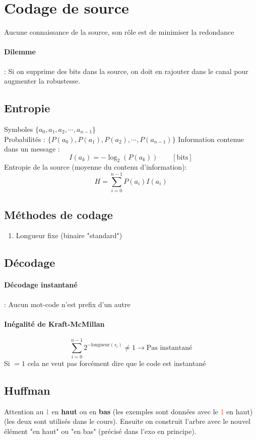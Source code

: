 \documentclass[resume]{subfiles}
\begin{document}
\section{Codage de source}
Aucune connaissance de la source, son rôle est de minimiser la redondance
\paragraph{Dilemme} : Si on supprime des bits dans la source, on doit en rajouter dans le canal pour augmenter la robustesse.
\subsection{Entropie}
Symboles $\lbrace a_0, a_1, a_2, \cdots, a_{n-1}\rbrace$\\
Probabilités : $\lbrace P(a_0), P(a_1), P(a_2), \cdots, P(a_{n-1})\rbrace$
Information contenue dans un message :
$$I(a_k)=-\log_2(P(a_k))\qquad [\text{bits}]$$
Entropie de la source (moyenne du contenu d'information):
$$H=\sum_{i=0}^{n-1}P(a_i)I(a_i)$$
\subsection{Méthodes de codage}
\begin{enumerate}
\item Longueur fixe (binaire "standard")
\end{enumerate}
\subsection{Décodage}
\paragraph{Décodage instantané} : Aucun mot-code n'est prefix d'un autre
\paragraph{Inégalité de Kraft-McMillan}
$$\sum_{i=0}^{n-1}2^{-\text{longueur}(s_i)}\neq 1\longrightarrow \text{Pas instantané}$$
Si $=1$ cela ne veut pas forcément dire que le code est instantané
\subsection{Huffman}
Attention au \textcolor{OrangeRed}{1} en \textbf{haut} ou en \textbf{bas} (les exemples sont données avec le \textcolor{OrangeRed}{1} en haut) (les deux sont utilisés dans le cours). Ensuite on construit l'arbre avec le nouvel élément "en haut" ou "en bas" (précisé dans l'exo en principe).\\
\end{document}
